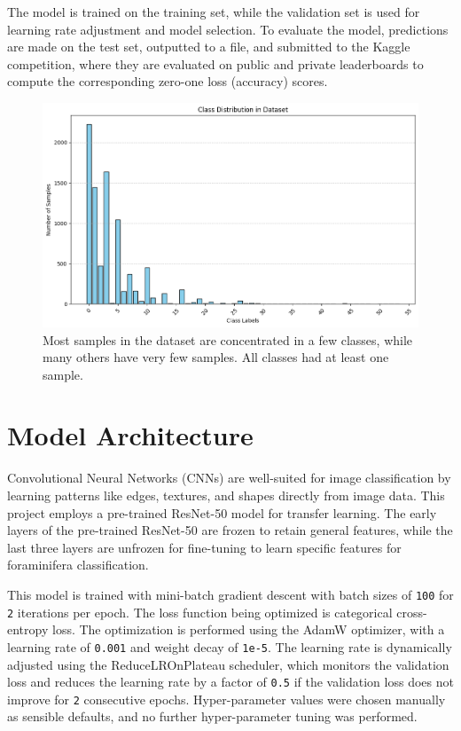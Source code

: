 \documentclass[letterpaper]{article}
\begin{document}
    The model is trained on the training set, while the validation set is used for learning rate adjustment and model selection. To evaluate the model, predictions are made on the test set, outputted to a file, and submitted to the Kaggle competition, where they are evaluated on public and private leaderboards to compute the corresponding zero-one loss (accuracy) scores.

    \begin{figure}[H]
        \centering
        \includegraphics[width=1\linewidth]{Figure0-ClassDistribution.png}
        \caption{Most samples in the dataset are concentrated in a few classes, while many others have very few samples. All classes had at least one sample.}
        \label{fig:class_distribution}
    \end{figure}
    
\section{Model Architecture}

    Convolutional Neural Networks (CNNs) are well-suited for image classification by learning patterns like edges, textures, and shapes directly from image data. This project employs a pre-trained ResNet-50 model for transfer learning. The early layers of the pre-trained ResNet-50 are frozen to retain general features, while the last three layers are unfrozen for fine-tuning to learn specific features for foraminifera classification.

    This model is trained with mini-batch gradient descent with batch sizes of \texttt{100} for \texttt{2} iterations per epoch. The loss function being optimized is categorical cross-entropy loss. The optimization is performed using the AdamW optimizer, with a learning rate of \texttt{0.001} and weight decay of \texttt{1e-5}. The learning rate is dynamically adjusted using the ReduceLROnPlateau scheduler, which monitors the validation loss and reduces the learning rate by a factor of \texttt{0.5} if the validation loss does not improve for \texttt{2} consecutive epochs. Hyper-parameter values were chosen manually as sensible defaults, and no further hyper-parameter tuning was performed.
    
\end{document}

